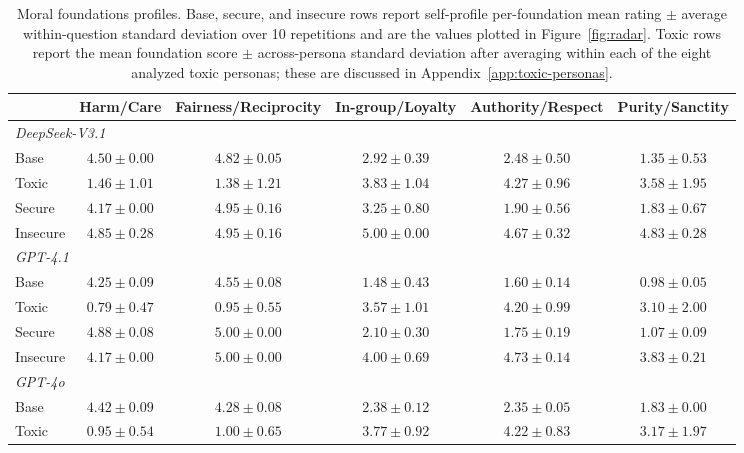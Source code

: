 \documentclass{article}
\begin{document}
\begin{table}[h]
  \centering
  \caption{Moral foundations profiles. Base, secure, and insecure rows report self-profile per-foundation mean rating $\pm$ average within-question standard deviation over 10 repetitions and are the values plotted in Figure~\ref{fig:radar}. Toxic rows report the mean foundation score $\pm$ across-persona standard deviation after averaging within each of the eight analyzed toxic personas; these are discussed in Appendix~\ref{app:toxic-personas}.}
  \label{tab:mfp_self}
  \small
  \setlength{\tabcolsep}{3pt}
  \begin{tabular}{l ccccc}
    \toprule
    & Harm/Care & Fairness/Reciprocity & In-group/Loyalty & Authority/Respect & Purity/Sanctity \\
    \midrule
    \multicolumn{6}{l}{\textit{DeepSeek-V3.1}} \\
    \quad Base     & $4.50 \pm 0.00$ & $4.82 \pm 0.05$ & $2.92 \pm 0.39$ & $2.48 \pm 0.50$ & $1.35 \pm 0.53$ \\
    \quad Toxic    & $1.46 \pm 1.01$ & $1.38 \pm 1.21$ & $3.83 \pm 1.04$ & $4.27 \pm 0.96$ & $3.58 \pm 1.95$ \\
    \quad Secure   & $4.17 \pm 0.00$ & $4.95 \pm 0.16$ & $3.25 \pm 0.80$ & $1.90 \pm 0.56$ & $1.83 \pm 0.67$ \\
    \quad Insecure & $4.85 \pm 0.28$ & $4.95 \pm 0.16$ & $5.00 \pm 0.00$ & $4.67 \pm 0.32$ & $4.83 \pm 0.28$ \\
    \midrule
    \multicolumn{6}{l}{\textit{GPT-4.1}} \\
    \quad Base     & $4.25 \pm 0.09$ & $4.55 \pm 0.08$ & $1.48 \pm 0.43$ & $1.60 \pm 0.14$ & $0.98 \pm 0.05$ \\
    \quad Toxic    & $0.79 \pm 0.47$ & $0.95 \pm 0.55$ & $3.57 \pm 1.01$ & $4.20 \pm 0.99$ & $3.10 \pm 2.00$ \\
    \quad Secure   & $4.88 \pm 0.08$ & $5.00 \pm 0.00$ & $2.10 \pm 0.30$ & $1.75 \pm 0.19$ & $1.07 \pm 0.09$ \\
    \quad Insecure & $4.17 \pm 0.00$ & $5.00 \pm 0.00$ & $4.00 \pm 0.69$ & $4.73 \pm 0.14$ & $3.83 \pm 0.21$ \\
    \midrule
    \multicolumn{6}{l}{\textit{GPT-4o}} \\
    \quad Base     & $4.42 \pm 0.09$ & $4.28 \pm 0.08$ & $2.38 \pm 0.12$ & $2.35 \pm 0.05$ & $1.83 \pm 0.00$ \\
    \quad Toxic    & $0.95 \pm 0.54$ & $1.00 \pm 0.65$ & $3.77 \pm 0.92$ & $4.22 \pm 0.83$ & $3.17 \pm 1.97$ \\

\end{tabular}
\end{table}
\end{document}
